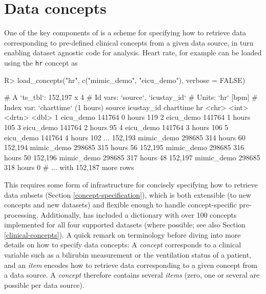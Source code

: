 \documentclass[
  notitle]{jss}
\begin{document}
\hypertarget{data-concepts}{%
\section{Data concepts}\label{data-concepts}}

One of the key components of  is a scheme for specifying how
to retrieve data corresponding to pre-defined clinical concepts from a
given data source, in turn enabling dataset agnostic code for analysis.
Heart rate, for example can be loaded using the \texttt{hr} concept as

\begin{CodeChunk}
\begin{CodeInput}
R> load_concepts("hr", c("mimic_demo", "eicu_demo"), verbose = FALSE)
\end{CodeInput}
\begin{CodeOutput}
# A `ts_tbl`: 152,197 x 4
# Id vars:    `source`, `icustay_id`
# Units:      `hr` [bpm]
# Index var:  `charttime` (1 hours)
        source     icustay_id charttime    hr
        <chr>           <int> <drtn>    <dbl>
      1 eicu_demo      141764   0 hours   119
      2 eicu_demo      141764   1 hours   105
      3 eicu_demo      141764   2 hours    95
      4 eicu_demo      141764   3 hours   106
      5 eicu_demo      141764   4 hours   102
    ...
152,193 mimic_demo     298685 314 hours    60
152,194 mimic_demo     298685 315 hours    56
152,195 mimic_demo     298685 316 hours    50
152,196 mimic_demo     298685 317 hours    48
152,197 mimic_demo     298685 318 hours     0
# ... with 152,187 more rows
\end{CodeOutput}
\end{CodeChunk}

This requires some form of infrastructure for concisely specifying how
to retrieve data subsets (Section \ref{concept-specification}), which is
both extensible (to new concepts and new datasets) and flexible enough
to handle concept-specific pre-processing. Additionally,  has
included a dictionary with over 100 concepts implemented for all four
supported datasets (where possible; see also Section
\ref{clinical-concepts}). A quick remark on terminology before diving
into more details on how to specify data concepts: A \emph{concept}
corresponds to a clinical variable such as a bilirubin measurement or
the ventilation status of a patient, and an \emph{item} encodes how to
retrieve data corresponding to a given concept from a data source. A
\emph{concept} therefore contains several \emph{items} (zero, one or
several are possible per data source).
\end{document}
